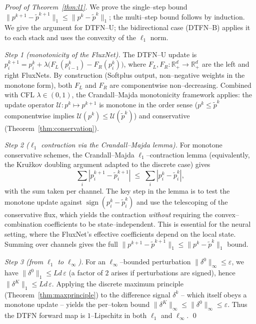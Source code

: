 \documentclass[10pt]{article}
\theoremstyle{definition}
\theoremstyle{remark}
\newcommand{\R}{\mathbb{R}}
\begin{document}
\begin{proof}[Proof of Theorem~\ref{thm:l1}]
  We prove the single--step bound $\|p^{k+1} - \tilde p^{k+1}\|_1 \le
  \|p^k - \tilde p^k\|_1$; the multi--step bound follows by induction.
  We give the argument for DTFN--U; the bidirectional case (DTFN--B)
  applies it to each stack and uses the convexity of the $\ell_1$ norm.

  \emph{Step 1 (monotonicity of the FluxNet).}
  The DTFN--U update is $p^{k+1}_i = p^k_i + \lambda\bigl(F_L(p^k_{i-1})
  - F_R(p^k_i)\bigr)$, where $F_L, F_R : \R_+^d \to \R_+^d$ are the
  left and right FluxNets.  By construction (Softplus output,
  non--negative weights in the monotone form), both $F_L$ and $F_R$
  are componentwise non--decreasing.  Combined with CFL
  $\lambda\in(0,1)$, the Crandall--Majda monotonicity framework
  \cite{crandall1980monotone} applies: the update operator
  $\mathcal{U} : p^k \mapsto p^{k+1}$ is monotone in the order sense
  ($p^k \le \tilde p^k$ componentwise implies $\mathcal{U}(p^k) \le
  \mathcal{U}(\tilde p^k)$) and conservative (Theorem~\ref{thm:conservation}).

  \emph{Step 2 ($\ell_1$ contraction via the Crandall--Majda lemma).}
  For monotone conservative schemes, the Crandall--Majda
  $\ell_1$--contraction lemma \cite[Thm.~3.1]{crandall1980monotone}
  (equivalently, the Kru\v{z}kov doubling argument adapted to the
  discrete case) gives
  \[
    \sum_i |p^{k+1}_i - \tilde p^{k+1}_i|
    \;\le\; \sum_i |p^k_i - \tilde p^k_i|,
  \]
  with the sum taken per channel.  The key step in the lemma is to
  test the monotone update against $\operatorname{sign}(p^k_i - \tilde
  p^k_i)$ and use the telescoping of the conservative flux, which
  yields the contraction \emph{without} requiring the convex--combination
  coefficients to be state--independent.  This is essential for the
  neural setting, where the FluxNet's effective coefficients depend on
  the local state.  Summing over channels gives the full
  $\|p^{k+1} - \tilde p^{k+1}\|_1 \le \|p^k - \tilde p^k\|_1$ bound.

  \emph{Step 3 (from $\ell_1$ to $\ell_\infty$).}
  For an $\ell_\infty$--bounded perturbation
  $\|\delta^0\|_\infty \le \varepsilon$, we have
  $\|\delta^0\|_1 \le L d\, \varepsilon$ (a factor of $2$ arises if
  perturbations are signed), hence
  $\|\delta^K\|_1 \le L d\, \varepsilon$.  Applying the discrete
  maximum principle (Theorem~\ref{thm:maxprinciple}) to the
  difference signal $\delta^k$ -- which itself obeys a monotone
  update -- yields the per--token bound
  $\|\delta^K\|_\infty \le \|\delta^0\|_\infty \le \varepsilon$.
  Thus the DTFN forward map is $1$--Lipschitz in both $\ell_1$ and
  $\ell_\infty$.
  \qed
\end{proof}
\end{document}
